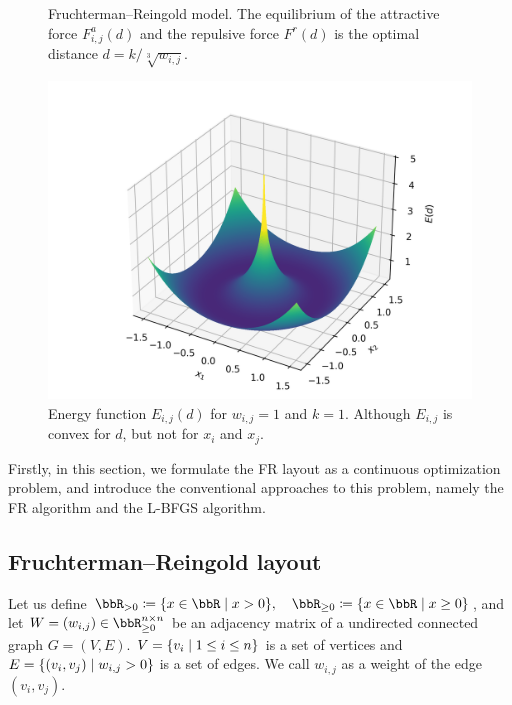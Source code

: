 \documentclass[dvipdfmx,journal]{IEEEtran}
\newcommand{\defeq}{\coloneqq}
\begin{document}
\begin{figure}[t]
\begin{minipage}{0.49\hsize}
    \caption{
      Fruchterman--Reingold model.
      The equilibrium of the attractive force $F_{i,j}^a(d)$ and the repulsive force $F^r(d)$ is the optimal distance $d=k/\sqrt[3]{w_{i,j}}$.
    }
  \end{minipage}
  \begin{minipage}{0.49\hsize}
    \centering
    \includegraphics[width=\columnwidth]{energy_3d.png}
    \caption{Energy function $E_{i,j}(d)$ for $w_{i,j} = 1$ and $k = 1$. Although $E_{i,j}$ is convex for $d$, but not for $x_i$ and $x_j$.}
    \label{fig:label}
  \end{minipage}
\end{figure}

Firstly, in this section, we formulate the FR layout as a continuous optimization problem, and introduce the conventional approaches to this problem, namely the FR algorithm and the L-BFGS algorithm.

\subsection{Fruchterman--Reingold layout}

Let us define
$\bbR_{> 0} \defeq \qty{ x \in \bbR \mid x > 0 }, \quad \bbR_{\geq 0} \defeq \qty{ x \in \bbR \mid x \geq 0 }$,
and let $W = (w_{i,j}) \in \bbR_{\geq 0}^{n \times n}$ be an adjacency matrix of a undirected connected graph $G = (V, E)$. $V = \qty{v_i \mid 1 \leq i \leq n}$ is a set of vertices and $E = \qty{(v_i, v_j) \mid w_{i,j} > 0}$ is a set of edges. We call $w_{i,j}$ as a weight of the edge $(v_i, v_j)$.
\end{document}
